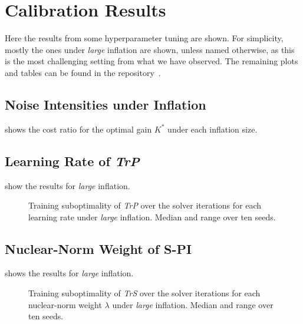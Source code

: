 \chapter{Calibration Results}
\label{app:calibration-results}

Here the results from some hyperparameter tuning are shown.
For simplicity, mostly the ones under \emph{large} inflation
are shown, unless named otherwise, as this is the most challenging setting from what
we have observed. The remaining plots and tables can be found in
the repository~\cite{Kranz2026LowDimControl}.

\section{Noise Intensities under Inflation}
\label{sec:app-noise-size-ratios}

 shows the cost ratio for the optimal gain $K^{*}$ under each inflation size.



\section{Learning Rate of \emph{TrP}}
\label{sec:app-learning-rate-mb-pg}

 show the results for
\emph{large} inflation.



\begin{figure}[htbp]
  \centering
  \caption{Training suboptimality of \emph{TrP} over the solver iterations for each learning rate
    under \emph{large} inflation. Median and range over ten seeds.}
  \label{fig:app-learning-rate-mb-pg-large}
\end{figure}

\section{Nuclear-Norm Weight of S-PI}
\label{sec:app-spi-lambda}

 shows the results for
\emph{large} inflation.

\begin{figure}[htbp]
  \centering
  \caption{Training suboptimality of \emph{TrS} over the solver iterations for each nuclear-norm weight
    $\lambda$ under \emph{large} inflation. Median and range over ten seeds.}
  \label{fig:app-spi-lambda-spi-large}
\end{figure}

